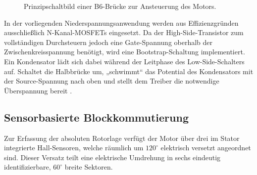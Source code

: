 \begin{figure}[htbp]
    \centering
    \caption{Prinzipschaltbild einer B6-Brücke zur Ansteuerung des Motors.}
    \label{fig:three_phase_bridge}
\end{figure}

In der vorliegenden Niederspannungsanwendung werden aus Effizienzgründen ausschließlich N-Kanal-MOSFETs eingesetzt. Da der High-Side-Transistor zum vollständigen Durchsteuern jedoch eine Gate-Spannung oberhalb der Zwischenkreisspannung benötigt, wird eine Bootstrap-Schaltung implementiert. Ein Kondensator lädt sich dabei während der Leitphase des Low-Side-Schalters auf. Schaltet die Halbbrücke um, „schwimmt“ das Potential des Kondensators mit der Source-Spannung nach oben und stellt dem Treiber die notwendige Überspannung bereit \cite[S.~1]{AN6076}.

\subsection{Sensorbasierte Blockkommutierung}
Zur Erfassung der absoluten Rotorlage verfügt der Motor über drei im Stator integrierte Hall-Sensoren, welche räumlich um $120^\circ$ elektrisch versetzt angeordnet sind. Dieser Versatz teilt eine elektrische Umdrehung in sechs eindeutig identifizierbare, $60^\circ$ breite Sektoren.


